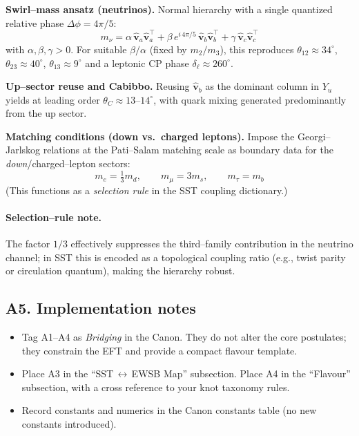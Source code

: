 \documentclass[11pt]{article}
\begin{document}
      \textbf{Swirl–mass ansatz (neutrinos).} Normal hierarchy with a single quantized relative phase $\Delta\phi=4\pi/5$:
      \[
          \boxed{\;
          m_\nu
              = \alpha\, \hat{\mathbf v}_a \hat{\mathbf v}_a^{\!\top}
              + \beta\, e^{i\,4\pi/5}\, \hat{\mathbf v}_b \hat{\mathbf v}_b^{\!\top}
              + \gamma\, \hat{\mathbf v}_c \hat{\mathbf v}_c^{\!\top} \;}
      \]
      with $\alpha,\beta,\gamma>0$. For suitable $\beta/\alpha$ (fixed by $m_2/m_3$), this reproduces
      $\theta_{12}\!\approx\!34^{\circ}$, $\theta_{23}\!\approx\!40^{\circ}$, $\theta_{13}\!\approx\!9^{\circ}$ and a leptonic CP phase $\delta_\ell\!\approx\!260^{\circ}$.

      \textbf{Up–sector reuse and Cabibbo.} Reusing $\hat{\mathbf v}_b$ as the dominant column in $Y_u$ yields at leading order
      $\theta_C\!\approx\!13\text{--}14^{\circ}$, with quark mixing generated predominantly from the up sector.

      \textbf{Matching conditions (down vs.\ charged leptons).} Impose the Georgi–Jarlskog relations at the Pati–Salam matching scale as boundary data for the \emph{down}/charged–lepton sectors:
      \[
          \boxed{\; m_e=\tfrac{1}{3}m_d,\qquad m_\mu=3m_s,\qquad m_\tau=m_b\;}
      \]
      (This functions as a \emph{selection rule} in the SST coupling dictionary.)

      \paragraph{Selection–rule note.} The factor $1/3$ effectively suppresses the third–family contribution in the neutrino channel; in SST this is encoded as a topological coupling ratio (e.g., twist parity or circulation quantum), making the hierarchy robust.

  \subsection*{A5. Implementation notes}
  \begin{itemize}
  \item Tag A1--A4 as \emph{Bridging} in the Canon. They do not alter the core postulates; they constrain the EFT and provide a compact flavour template.
  \item Place A3 in the ``SST\,$\leftrightarrow$\,EWSB Map'' subsection. Place A4 in the ``Flavour'' subsection, with a cross reference to your knot taxonomy rules.
  \item Record constants and numerics in the Canon constants table (no new constants introduced).
  \end{itemize}
\end{document}
